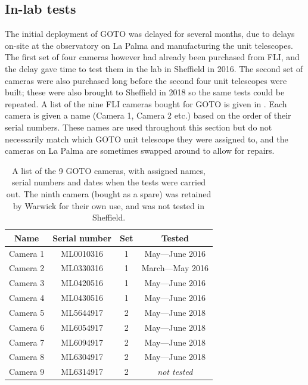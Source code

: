 
\subsection{In-lab tests}
\label{sec:camera_tests}
\begin{colsection}

The initial deployment of GOTO was delayed for several months, due to delays on-site at the observatory on La Palma and manufacturing the unit telescopes. The first set of four cameras however had already been purchased from FLI, and the delay gave time to test them in the lab in Sheffield in 2016. The second set of cameras were also purchased long before the second four unit telescopes were built; these were also brought to Sheffield  in 2018 so the same tests could be repeated. A list of the nine FLI cameras bought for GOTO is given in . Each camera is given a name (Camera 1, Camera 2 etc.) based on the order of their serial numbers. These names are used throughout this section but do not necessarily match which GOTO unit telescope they were assigned to, and the cameras on La Palma are sometimes swapped around to allow for repairs.

\begin{table}[t]
    \begin{center}
        \begin{tabular}{c|ccc} %
            Name     & Serial number & Set & Tested \\
            \midrule
            Camera 1 & ML0010316     &   1 & May---June 2016     \\
            Camera 2 & ML0330316     &   1 & March---May 2016    \\
            Camera 3 & ML0420516     &   1 & May---June 2016     \\
            Camera 4 & ML0430516     &   1 & May---June 2016     \\
            Camera 5 & ML5644917     &   2 & May---June 2018     \\
            Camera 6 & ML6054917     &   2 & May---June 2018     \\
            Camera 7 & ML6094917     &   2 & May---June 2018     \\
            Camera 8 & ML6304917     &   2 & May---June 2018     \\
            Camera 9 & ML6314917     &   2 & \textit{not tested} \\
        \end{tabular}
    \end{center}
    \caption[List of GOTO cameras]{
        A list of the 9 GOTO cameras, with assigned names, serial numbers and dates when the tests were carried out. The ninth camera (bought as a spare) was retained by Warwick for their own use, and was not tested in Sheffield.
    }\label{tab:cameras}
\end{table}


\end{colsection}
